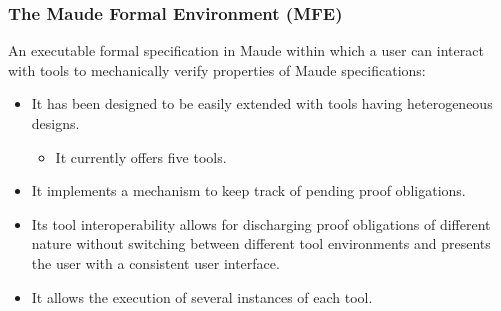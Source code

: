 \documentclass[xcolor=dvipsnames,10pt]{beamer}
\newcommand{\enfa}[1]{{\color{Red}#1}}
\begin{document}

\begin{frame}
  \frametitle{The Maude Formal Environment (MFE)}

  An \enfa{executable formal specification in Maude}
  within which a user can interact with tools to mechanically verify properties
  of Maude specifications:

  \begin{itemize}
    \item It has been designed to be easily extended with tools having
      \enfa{heterogeneous designs}.

    \begin{itemize}
      \item It currently offers five tools.
    \end{itemize}

    \item It implements a \enfa{mechanism to keep track of pending proof
      obligations}.

    \item Its \enfa{tool interoperability} allows for discharging proof obligations of
      different nature without switching between different tool environments
      and presents the user with \enfa{a consistent user interface}.

    \item It allows the execution of several instances of each tool.

  \end{itemize}
\end{frame}





%      
\end{document}
